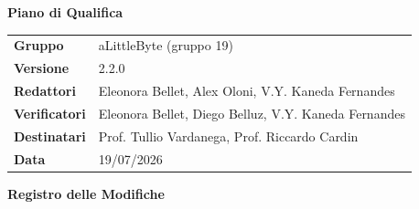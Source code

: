\documentclass[a4paper,12pt]{article}
\begin{document}
\hypersetup{pageanchor=false}

\thispagestyle{firstpage}

\vspace*{0.5cm}

\begin{center}
    {\LARGE \textbf{Piano di Qualifica}}
\end{center}

\vspace{1.5cm}

\begin{center}
    \renewcommand{\arraystretch}{1.3}
    \begin{tcolorbox}[
        width=0.92\textwidth,
        colback=gray!6,
        colframe=gray!45,
        boxrule=0.5pt,
        arc=2mm,
        boxsep=0pt,
        left=8pt, right=8pt, top=8pt, bottom=8pt
    ]
        \begin{tabularx}{\linewidth}{>{\bfseries}p{3.5cm} X}
            Gruppo      & aLittleByte (gruppo 19) \\
            Versione    & 2.2.0 \\
            Redattori   & Eleonora Bellet, Alex Oloni, V.Y. Kaneda Fernandes \\
            Verificatori& Eleonora Bellet, Diego Belluz, V.Y. Kaneda Fernandes\\
            Destinatari & Prof. Tullio Vardanega, Prof. Riccardo Cardin \\
            Data        & 19/07/2026 \\
        \end{tabularx}
    \end{tcolorbox}
\end{center}

\newpage


\begin{center}
    {\Large \textbf{Registro delle Modifiche}}
\end{center}

\vspace{0.35cm}
\end{document}
